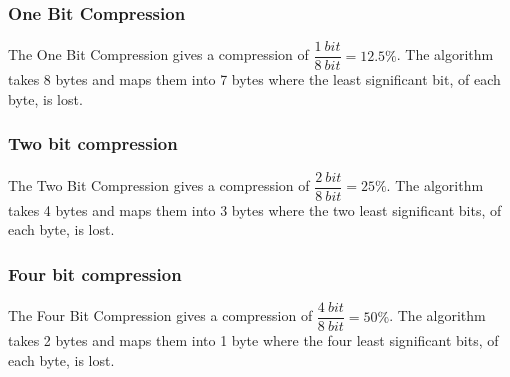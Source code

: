 \subsubsection{One Bit Compression} %
\label{sub:one_bit_compression}

The One Bit Compression gives a compression of $\dfrac{1\ bit}{8\ bit} = 12.5\%$.
The algorithm takes 8 bytes and maps them into 7 bytes where the least significant bit, of each byte, is lost.

\subsubsection{Two bit compression} %
\label{sub:two_bit_compression}

The Two Bit Compression gives a compression of $\dfrac{2\ bit}{8\ bit} = 25\%$.
The algorithm takes 4 bytes and maps them into 3 bytes where the two least significant bits, of each byte, is lost.

\subsubsection{Four bit compression} %
\label{sub:four_bit_compression}

The Four Bit Compression gives a compression of $\dfrac{4\ bit}{8\ bit} = 50\%$.
The algorithm takes 2 bytes and maps them into 1 byte where the four least significant bits, of each byte, is lost.
